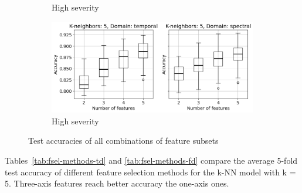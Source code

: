 \documentclass{llncs}
\begin{document}
\begin{figure}
\begin{subfigure}[b]{0.45\textwidth}
         \caption{High severity}
         \label{fig:all-models-severity-f-3}
     \end{subfigure}
     \hfill
     \begin{subfigure}[b]{0.45\textwidth}
         \centering
         \includegraphics[width=\textwidth]{fig/combinations-mafaulda/all-axis-severity-k5.png}
         \caption{High severity}
         \label{fig:all-models-severity-k-5}
     \end{subfigure}
     \caption{Test accuracies of all combinations of feature subsets}
\end{figure}

Tables~\ref{tab:fsel-methods-td} and \ref{tab:fsel-methods-fd} compare the average 5-fold test accuracy of different feature selection methods for the k-NN model with k = 5. Three-axis features reach better accuracy the one-axis ones.
\end{document}
